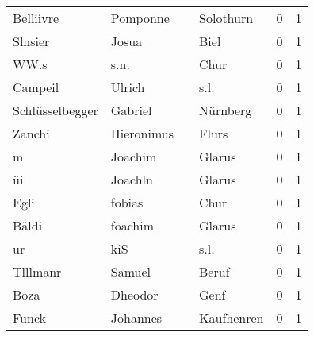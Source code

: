 \documentclass[10pt,a4paper,landscape]{article}
\begin{document}
\begin{longtable}{llllrr}
                Belliivre &                           Pomponne &             &                                   Solothurn &          0 &         1 \\
                  Slnsier &                              Josua &             &                                        Biel &          0 &         1 \\
                     WW.s &                               s.n. &             &                                        Chur &          0 &         1 \\
                  Campeil &                             Ulrich &             &                                        s.l. &          0 &         1 \\
          Schlüsselbegger &                            Gabriel &             &                                    Nürnberg &          0 &         1 \\
                   Zanchi &                         Hieronimus &             &                                       Flurs &          0 &         1 \\
                        m &                            Joachim &             &                                      Glarus &          0 &         1 \\
                       üi &                            Joachln &             &                                      Glarus &          0 &         1 \\
                     Egli &                             fobias &             &                                        Chur &          0 &         1 \\
                    Bäldi &                            foachim &             &                                      Glarus &          0 &         1 \\
                       ur &                                kiS &             &                                        s.l. &          0 &         1 \\
                 Tlllmanr &                             Samuel &             &                                       Beruf &          0 &         1 \\
                     Boza &                            Dheodor &             &                                        Genf &          0 &         1 \\
                    Funck &                           Johannes &             &                                  Kaufhenren &          0 &         1 \\

\end{longtable}
\end{document}
